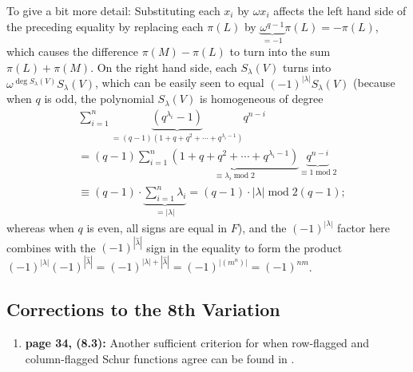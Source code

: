 \documentclass[numbers=enddot,12pt,final,onecolumn,notitlepage]{scrartcl}%
\theoremstyle{definition}
\let\sumnonlimits\sum
\renewcommand{\sum}{\sumnonlimits\limits}
\begin{document}
\begin{enumerate}
To give a bit more detail: Substituting each $x_{i}$ by $\omega x_{i}$ affects
the left hand side of the preceding equality by replacing each $\pi\left(
L\right)  $ by $\underbrace{\omega^{q-1}}_{=-1}\pi\left(  L\right)
=-\pi\left(  L\right)  $, which causes the difference $\pi\left(  M\right)
-\pi\left(  L\right)  $ to turn into the sum $\pi\left(  L\right)  +\pi\left(
M\right)  $. On the right hand side, each $S_{\lambda}\left(  V\right)  $
turns into $\omega^{\deg S_{\lambda}\left(  V\right)  }S_{\lambda}\left(
V\right)  $, which can be easily seen to equal $\left(  -1\right)
^{\left\vert \lambda\right\vert }S_{\lambda}\left(  V\right)  $ (because when
$q$ is odd, the polynomial $S_{\lambda}\left(  V\right)  $ is homogeneous of
degree%
\begin{align*}
&  \sum_{i=1}^{n}\underbrace{\left(  q^{\lambda_{i}}-1\right)  }_{=\left(
q-1\right)  \left(  1+q+q^{2}+\cdots+q^{\lambda_{i}-1}\right)  }q^{n-i}\\
&  =\left(  q-1\right)  \sum_{i=1}^{n}\underbrace{\left(  1+q+q^{2}%
+\cdots+q^{\lambda_{i}-1}\right)  }_{\equiv\lambda_{i}\operatorname{mod}%
2}\underbrace{q^{n-i}}_{\equiv1\operatorname{mod}2}\\
&  \equiv\left(  q-1\right)  \cdot\underbrace{\sum_{i=1}^{n}\lambda_{i}%
}_{=\left\vert \lambda\right\vert }=\left(  q-1\right)  \cdot\left\vert
\lambda\right\vert \operatorname{mod}2\left(  q-1\right)  ;
\end{align*}
whereas when $q$ is even, all signs are equal in $F$), and the $\left(
-1\right)  ^{\left\vert \lambda\right\vert }$ factor here combines with the
$\left(  -1\right)  ^{\left\vert \widehat{\lambda}\right\vert }$ sign in the
equality to form the product $\left(  -1\right)  ^{\left\vert \lambda
\right\vert }\left(  -1\right)  ^{\left\vert \widehat{\lambda}\right\vert
}=\left(  -1\right)  ^{\left\vert \lambda\right\vert +\left\vert
\widehat{\lambda}\right\vert }=\left(  -1\right)  ^{\left\vert \left(
m^{n}\right)  \right\vert }=\left(  -1\right)  ^{nm}$.
\end{enumerate}

\subsection{Corrections to the 8th Variation}

\begin{enumerate}
\item \textbf{page 34, (8.3):} Another sufficient criterion for when
row-flagged and column-flagged Schur functions agree can be found in
\cite[Theorem 1.4]{McDowe23}.
\end{enumerate}
\end{document}
